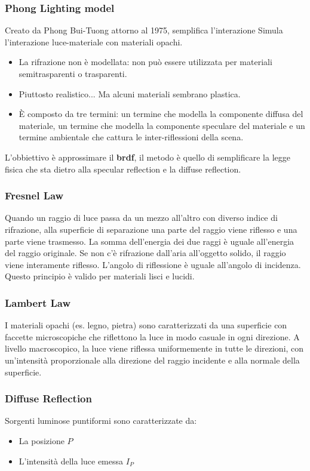 \subsubsection{Phong Lighting model}
Creato da Phong Bui-Tuong attorno al 1975, semplifica l'interazione 
Simula l'interazione luce-materiale con materiali opachi.
\begin{itemize}
    \item La rifrazione non è modellata: non può essere utilizzata per materiali semitrasparenti o trasparenti.
    \item Piuttosto realistico... Ma alcuni materiali sembrano plastica.
    \item È composto da tre termini: un termine che modella la componente diffusa del materiale, un termine che modella la componente speculare del materiale e un termine ambientale che cattura le inter-riflessioni della scena.
\end{itemize}
L'obbiettivo è approssimare il \textbf{brdf}, il metodo è quello di semplificare la legge fisica che sta dietro alla specular reflection e la diffuse reflection.
\subsubsection{Fresnel Law}
Quando un raggio di luce passa da un mezzo all'altro con diverso indice di rifrazione, alla superficie di separazione una parte del raggio viene riflesso e una parte viene trasmesso. La somma dell'energia dei due raggi è uguale all'energia del raggio originale.
Se non c'è rifrazione dall'aria all'oggetto solido, il raggio viene interamente riflesso. L'angolo di riflessione è uguale all'angolo di incidenza. Questo principio è valido per materiali lisci e lucidi.
\subsubsection{Lambert Law}
I materiali opachi (es. legno, pietra) sono caratterizzati da una superficie con faccette microscopiche che riflettono la luce in modo casuale in ogni direzione. A livello macroscopico, la luce viene riflessa uniformemente in tutte le direzioni, con un'intensità proporzionale alla direzione del raggio incidente e alla normale della superficie.
\subsubsection{Diffuse Reflection}
Sorgenti luminose puntiformi sono caratterizzate da:
\begin{itemize}
    \item La posizione $P$
    \item L'intensità della luce emessa $I_P$
\end{itemize}

